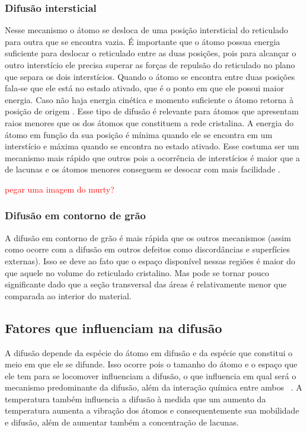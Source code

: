 \documentclass[]{politex}
\newcommand\myworries[1]{\textcolor{red}{#1}}
\begin{document}
\subsubsection{Difusão intersticial}
	Nesse mecanismo o átomo se desloca de uma posição intersticial do reticulado para outra que se encontra vazia. É importante que o átomo possua energia suficiente para deslocar o reticulado entre as duas posições, pois para alcançar o outro interstício ele precisa superar as forças de repulsão do reticulado no plano que separa os dois interstícios. Quando o átomo se encontra entre duas posições fala-se que ele está no estado ativado, que é o ponto em que ele possui maior energia. Caso não haja energia cinética e momento suficiente o átomo retorna à posição de origem \cite{glicksman2000diffusion}. 
	Esse tipo de difusão é relevante para átomos que apresentam raios menores que os dos átomos que constituem a rede cristalina. A energia do átomo em função da sua posição é mínima quando ele se encontra em um interstício e máxima quando se encontra no estado ativado. Esse costuma ser um mecanismo mais rápido que outros pois a ocorrência de interstícios é maior que a de lacunas e os átomos menores conseguem se desocar com mais facilidade \cite{murty2013introduction}.
	
\myworries {pegar uma imagem do murty?}
	
\subsubsection{Difusão em contorno de grão}
A difusão em contorno de grão é mais rápida que os outros mecanismos (assim como ocorre com a difusão em outros defeitos como discordâncias e superfícies externas). Isso se deve ao fato que o espaço disponível nessas regiões é maior do que aquele no volume do reticulado cristalino. Mas pode se tornar pouco significante dado que a seção transversal das áreas é relativamente menor que comparada ao interior do material. 

\subsection{Fatores que influenciam na difusão}
	A difusão depende da espécie do átomo em difusão e da espécie que constitui o meio em que ele se difunde. Isso ocorre pois o tamanho do átomo e o espaço que ele tem para se locomover influenciam a difusão, o que influencia em qual será o mecanismo predominante da difusão, além da interação química entre ambos ~\cite{callister2007materials}.
	A temperatura também influencia a difusão à medida que um aumento da temperatura aumenta a vibração dos átomos e consequentemente sua mobilidade e difusão, além de aumentar também a concentração de lacunas. 
\end{document}
